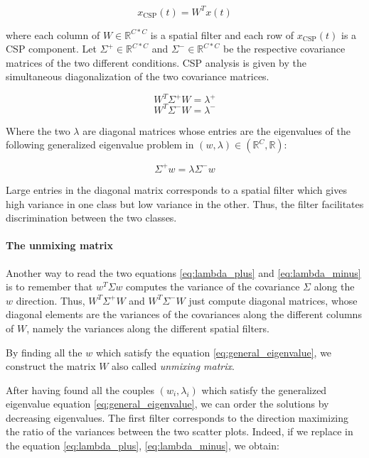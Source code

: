 \begin{equation}
    x_{\text{CSP}}(t) = W^{T}x(t)
\end{equation}

where each column of $W \in \mathbb{R}^{C*C}$ is a spatial filter and each row of $x_{\text{CSP}}(t)$ is a CSP component. Let $\Sigma^{+} \in \mathbb{R}^{C * C}$ and $\Sigma^{-} \in \mathbb{R}^{C * C}$ be the respective covariance matrices of the two different conditions. CSP analysis is given by the simultaneous diagonalization of the two covariance matrices.


\begin{equation}
    W^{T} \Sigma^{+} W = \lambda^{+}
    \label{eq:lambda_plus}
\end{equation}
\begin{equation}
    W^{T} \Sigma^{-} W = \lambda^{-}
    \label{eq:lambda_minus}
\end{equation}

Where the two $\lambda$ are diagonal matrices whose entries are the eigenvalues of the following generalized eigenvalue problem in $(w, \lambda) \in (\mathbb{R}^{C}, \mathbb{R})$:

\begin{equation}
    \Sigma^{+} w = \lambda \Sigma^{-} w
    \label{eq:general_eigenvalue}
\end{equation}

Large entries in the diagonal matrix corresponds to a spatial filter which gives high variance in one class but low variance in the other. Thus, the filter facilitates discrimination between the two classes.

\paragraph{The unmixing matrix}

Another way to read the two equations \ref{eq:lambda_plus} and \ref{eq:lambda_minus} is to remember that $w^{T}\Sigma w$ computes the variance of the covariance $\Sigma$ along the $w$ direction. Thus, $W^{T} \Sigma^{+} W$ and $W^{T} \Sigma^{-} W$ just compute diagonal matrices, whose diagonal elements are the variances of the covariances along the different columns of $W$, namely the variances along the different spatial filters.

By finding all the $w$ which satisfy the equation \ref{eq:general_eigenvalue}, we construct the matrix $W$ also called \textit{unmixing matrix}.

After having found all the couples $(w_i, \lambda_i)$ which satisfy the generalized eigenvalue equation \ref{eq:general_eigenvalue}, we can order the solutions by decreasing eigenvalues. The first filter corresponds to the direction maximizing the ratio of the variances between the two scatter plots. Indeed, if we replace in the equation \ref{eq:lambda_plus}, \ref{eq:lambda_minus}, we obtain:

